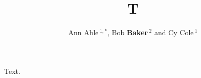\documentclass{article}
\def\Authors{Ann Able\,$^{1,*}$, Bob \textbf{Baker}\,$^{2}$ and Cy Cole\,$^{1}$}
\begin{document}
\title{T}
\author{\Authors}
\maketitle
Text.
\end{document}
